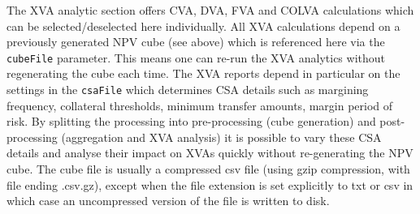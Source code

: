 \documentclass[12pt, a4paper]{article}
\begin{document}
\medskip The XVA analytic section offers CVA, DVA, FVA and COLVA calculations which can be selected/deselected here
individually. All XVA calculations depend on a previously generated NPV cube (see above) which is referenced here via
the {\tt cubeFile} parameter. This means one can re-run the XVA analytics without regenerating the cube each time. The
XVA reports depend in particular on the settings in the {\tt csaFile} which determines CSA details such as margining
frequency, collateral thresholds, minimum transfer amounts, margin period of risk. By splitting the processing into
pre-processing (cube generation) and post-processing (aggregation and XVA analysis) it is possible to vary these CSA
details and analyse their impact on XVAs quickly without re-generating the NPV cube. The cube file is usually a
compressed csv file (using gzip compression, with file ending .csv.gz), except when the file extension is set explicitly
to txt or csv in which case an uncompressed version of the file is written to disk.
\end{document}
